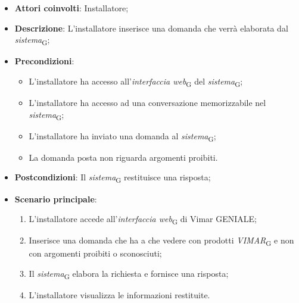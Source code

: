 \begin{itemize}
    \item \textbf{Attori coinvolti}: Installatore;
    \item \textbf{Descrizione}: L’installatore inserisce una domanda che verrà elaborata dal \textit{sistema}\textsubscript{G};
    \item \textbf{Precondizioni}: 
    \begin{itemize}
        \item L’installatore ha accesso all’\textit{interfaccia web}\textsubscript{G} del \textit{sistema}\textsubscript{G};
        \item L’installatore ha accesso ad una conversazione memorizzabile nel \textit{sistema}\textsubscript{G};
        \item L'installatore ha inviato una domanda al \textit{sistema}\textsubscript{G};
        \item La domanda posta non riguarda argomenti proibiti.
    \end{itemize}
    \item \textbf{Postcondizioni}: Il \textit{sistema}\textsubscript{G} restituisce una risposta;
    \item \textbf{Scenario principale}:
    \begin{enumerate}
        \item L’installatore accede all’\textit{interfaccia web}\textsubscript{G} di Vimar GENIALE;
        \item Inserisce una domanda che ha a che vedere con prodotti \textit{VIMAR}\textsubscript{G} e non con argomenti proibiti o sconosciuti;
        \item Il \textit{sistema}\textsubscript{G} elabora la richiesta e fornisce una risposta;
        \item L’installatore visualizza le informazioni restituite.
    \end{enumerate}
\end{itemize}
